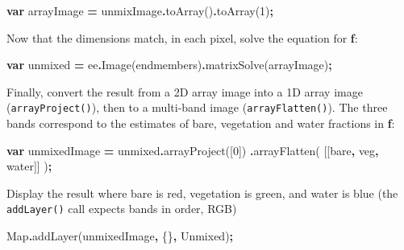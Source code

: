 \documentclass[
]{article}
\newenvironment{Shaded}{\begin{snugshade}}{\end{snugshade}}
\newcommand{\BuiltInTok}[1]{#1}
\newcommand{\DecValTok}[1]{\textcolor[rgb]{0.00,0.00,0.81}{#1}}
\newcommand{\FunctionTok}[1]{\textcolor[rgb]{0.00,0.00,0.00}{#1}}
\newcommand{\KeywordTok}[1]{\textcolor[rgb]{0.13,0.29,0.53}{\textbf{#1}}}
\newcommand{\NormalTok}[1]{#1}
\newcommand{\OperatorTok}[1]{\textcolor[rgb]{0.81,0.36,0.00}{\textbf{#1}}}
\newcommand{\StringTok}[1]{\textcolor[rgb]{0.31,0.60,0.02}{#1}}
\begin{document}
\begin{Shaded}
\begin{Highlighting}[]
\KeywordTok{var}\NormalTok{ arrayImage }\OperatorTok{=}\NormalTok{ unmixImage}\OperatorTok{.}\FunctionTok{toArray}\NormalTok{()}\OperatorTok{.}\FunctionTok{toArray}\NormalTok{(}\DecValTok{1}\NormalTok{)}\OperatorTok{;}
\end{Highlighting}
\end{Shaded}

Now that the dimensions match, in each pixel, solve the equation for \textbf{f}:

\begin{Shaded}
\begin{Highlighting}[]
\KeywordTok{var}\NormalTok{ unmixed }\OperatorTok{=}\NormalTok{  ee}\OperatorTok{.}\FunctionTok{Image}\NormalTok{(endmembers)}\OperatorTok{.}\FunctionTok{matrixSolve}\NormalTok{(arrayImage)}\OperatorTok{;}
\end{Highlighting}
\end{Shaded}

Finally, convert the result from a 2D array image into a 1D array image (\texttt{arrayProject()}), then to a multi-band image (\texttt{arrayFlatten()}). The three bands correspond to the estimates of bare, vegetation and water fractions in \textbf{f}:

\begin{Shaded}
\begin{Highlighting}[]
\KeywordTok{var}\NormalTok{ unmixedImage }\OperatorTok{=}\NormalTok{ unmixed}\OperatorTok{.}\FunctionTok{arrayProject}\NormalTok{([}\DecValTok{0}\NormalTok{])}
                \OperatorTok{.}\FunctionTok{arrayFlatten}\NormalTok{(}
\NormalTok{          [[}\StringTok{\textquotesingle{}bare\textquotesingle{}}\OperatorTok{,} \StringTok{\textquotesingle{}veg\textquotesingle{}}\OperatorTok{,} \StringTok{\textquotesingle{}water\textquotesingle{}}\NormalTok{]]}
\NormalTok{        )}\OperatorTok{;}  
\end{Highlighting}
\end{Shaded}

Display the result where bare is red, vegetation is green, and water is blue (the \texttt{addLayer()} call expects bands in order, RGB)

\begin{Shaded}
\begin{Highlighting}[]
\BuiltInTok{Map}\OperatorTok{.}\FunctionTok{addLayer}\NormalTok{(unmixedImage}\OperatorTok{,}\NormalTok{ \{\}}\OperatorTok{,} \StringTok{\textquotesingle{}Unmixed\textquotesingle{}}\NormalTok{)}\OperatorTok{;}  
\end{Highlighting}
\end{Shaded}
\end{document}
